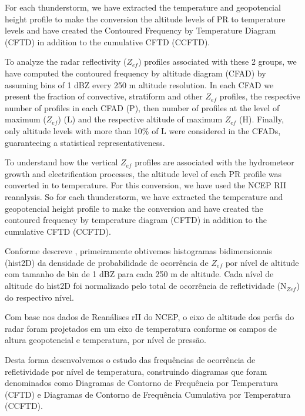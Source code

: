 For each thunderstorm, we have extracted the temperature and
geopotencial height profile to make the conversion the altitude levels of PR to temperature levels and have created the Contoured Frequency by Temperature Diagram (CFTD) in addition to the cumulative CFTD (CCFTD).


To analyze the radar reflectivity ($Z_{ef}$) profiles associated with these 2 groups, we have computed the contoured frequency by altitude diagram (CFAD)  by assuming bins of 1 dBZ every 250 m altitude resolution. In each CFAD we present the fraction of convective, stratiform and other $Z_{ef}$ profiles, the respective number of profiles in each CFAD (P), then number of profiles at the level of maximum ($Z_{ef}$) (L) and the respective altitude of maximum $Z_{ef}$ (H). Finally, only altitude levels with more than 10\% of L were considered in the CFADs, guaranteeing a statistical representativeness. 

To understand how the vertical $Z_{ef}$ profiles are associated with the hydrometeor growth and electrification processes, the altitude level of each PR profile was converted in to temperature. For this conversion, we have used the NCEP RII reanalysis. So for each thunderstorm, we have extracted the temperature and geopotencial height profile to make the conversion and have created the contoured frequency by temperature diagram (CFTD) in addition to the cumulative CFTD (CCFTD).





Conforme descreve \cite{yuter1995}, primeiramente obtivemos histogramas bidimensionais (hist2D) da densidade de probabilidade de ocorrência de $Z_{ef}$ por nível de altitude com tamanho de bin de 1 dBZ para cada 250 m de altitude. Cada nível de altitude do hist2D foi normalizado pelo total de ocorrência de refletividade (N$_{Zef}$) do respectivo nível.


Com base nos dados de Reanálises rII do NCEP, o eixo de altitude dos perfis do radar foram projetados em um eixo de temperatura conforme os campos de altura geopotencial e temperatura, por nível de pressão.

Desta forma desenvolvemos o estudo das frequências de ocorrência de refletividade por nível de temperatura, construindo diagramas que foram denominados como Diagramas de Contorno de Frequência por Temperatura (CFTD) e Diagramas de Contorno de Frequência Cumulativa por Temperatura (CCFTD).







